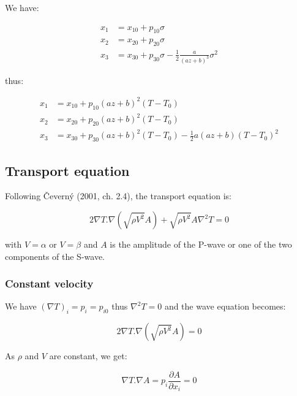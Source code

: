 \documentclass[methods.tex]{subfiles}
\begin{document}
We have:

\begin{equation}
\begin{split}
x_1 & = x_{10} + p_{10} \sigma \\
x_2 & = x_{20} + p_{20} \sigma \\
x_3 & = x_{30} + p_{30} \sigma - \frac{1}{2} \frac{a}{(a z + b)^3} \sigma^2
\end{split}
\end{equation}

thus:

\begin{equation}
\begin{split}
x_1 & = x_{10} + p_{10} (a z + b)^2 (T - T_0) \\
x_2 & = x_{20} + p_{20} (a z + b)^2 (T - T_0) \\
x_3 & = x_{30} + p_{30} (a z + b)^2 (T - T_0) - \frac{1}{2} a (a z + b) (T - T_0)^2
\end{split}
\end{equation}

\subsection{Transport equation}

Following \v Cevern\'y (2001, ch. 2.4), the transport equation is:

\begin{equation}
2 \nabla T . \nabla (\sqrt{\rho V^2} A) + \sqrt{\rho V^2} A \nabla^2 T = 0
\end{equation}

with $V = \alpha$ or $V= \beta$ and $A$ is the amplitude of the P-wave or one of the two components of the S-wave.

\subsubsection{Constant velocity}

We have $(\nabla T)_i = p_i = p_{i0}$ thus $\nabla^2 T = 0$ and the wave equation becomes:

\begin{equation}
2 \nabla T . \nabla (\sqrt{\rho V^2} A) = 0
\end{equation}

As $\rho$ and $V$ are constant, we get:

\begin{equation}
\nabla T . \nabla A = p_i \frac{\partial A}{\partial x_i} = 0
\end{equation}
\end{document}
